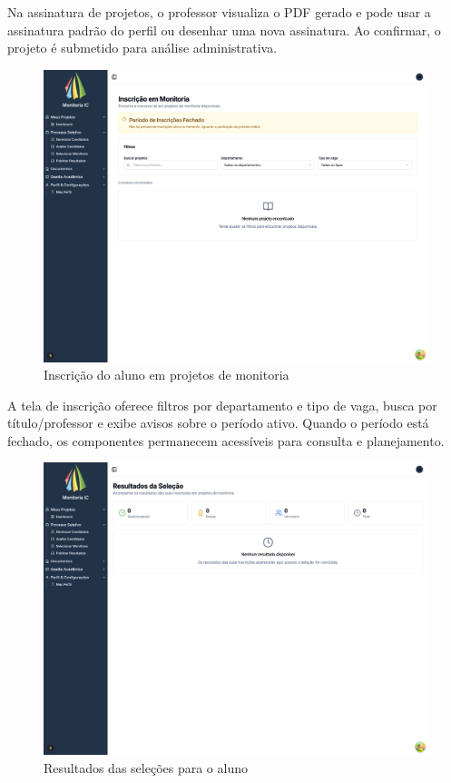 \documentclass[portuguese]{sbc2025}%
\begin{document}
Na assinatura de projetos, o professor visualiza o PDF gerado e pode usar a assinatura padrão do perfil ou desenhar uma nova assinatura. Ao confirmar, o projeto é submetido para análise administrativa.

\begin{figure}[h!]
  \centering
  \includegraphics[width=\linewidth]{images/monitoria/student-inscricao-monitoria.png}
  \caption{Inscrição do aluno em projetos de monitoria}
  \label{fig:student-inscricao}
\end{figure}

A tela de inscrição oferece filtros por departamento e tipo de vaga, busca por título/professor e exibe avisos sobre o período ativo. Quando o período está fechado, os componentes permanecem acessíveis para consulta e planejamento.

\begin{figure}[h!]
  \centering
  \includegraphics[width=\linewidth]{images/monitoria/student-resultados.png}
  \caption{Resultados das seleções para o aluno}
  \label{fig:student-resultados}
\end{figure}
\end{document}
